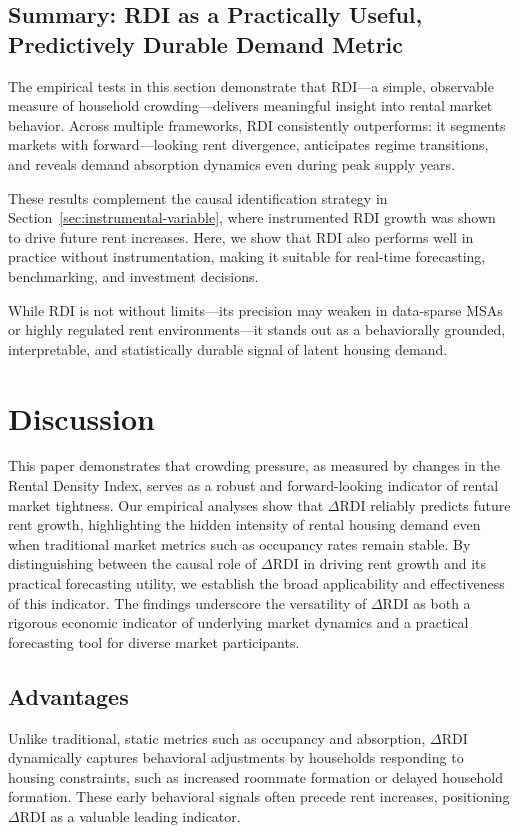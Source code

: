 \documentclass[APA,Times1COL]{WileyNJDv5} %
\begin{document}
\subsection{Summary: RDI as a Practically Useful, Predictively Durable Demand Metric}
The empirical tests in this section demonstrate that RDI---a simple, observable measure of household crowding---delivers meaningful insight into rental market behavior. Across multiple frameworks, RDI consistently outperforms: it segments markets with forward---looking rent divergence, anticipates regime transitions, and reveals demand absorption dynamics even during peak supply years.

These results complement the causal identification strategy in Section~\ref{sec:instrumental-variable}, where instrumented RDI growth was shown to drive future rent increases. Here, we show that RDI also performs well in practice without instrumentation, making it suitable for real-time forecasting, benchmarking, and investment decisions.

While RDI is not without limits---its precision may weaken in data-sparse MSAs or highly regulated rent environments---it stands out as a behaviorally grounded, interpretable, and statistically durable signal of latent housing demand.


\section{Discussion}
This paper demonstrates that crowding pressure, as measured by changes in the Rental Density Index, serves as a robust and forward-looking indicator of rental market tightness. Our empirical analyses show that \(\Delta\text{RDI}\) reliably predicts future rent growth, highlighting the hidden intensity of rental housing demand even when traditional market metrics such as occupancy rates remain stable. By distinguishing between the causal role of \(\Delta\text{RDI}\) in driving rent growth and its practical forecasting utility, we establish the broad applicability and effectiveness of this indicator. The findings underscore the versatility of \(\Delta\text{RDI}\) as both a rigorous economic indicator of underlying market dynamics and a practical forecasting tool for diverse market participants.

\subsection{Advantages}
Unlike traditional, static metrics such as occupancy and absorption, \(\Delta\text{RDI}\) dynamically captures behavioral adjustments by households responding to housing constraints, such as increased roommate formation or delayed household formation. These early behavioral signals often precede rent increases, positioning \(\Delta\text{RDI}\) as a valuable leading indicator.
\end{document}
